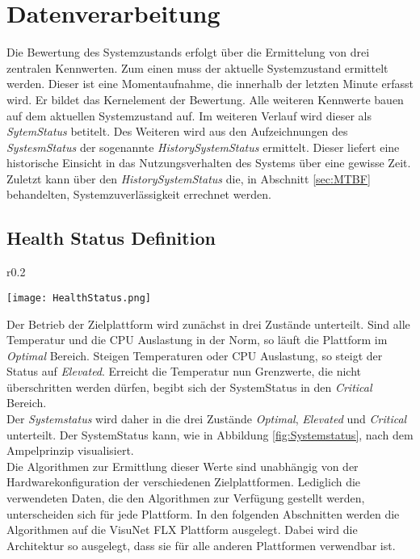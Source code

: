 \section{Datenverarbeitung}\label{sec:Datenverarbeitung}
Die Bewertung des Systemzustands erfolgt über die Ermittelung von drei zentralen Kennwerten. Zum einen muss der aktuelle Systemzustand ermittelt werden. Dieser ist eine Momentaufnahme, die innerhalb der letzten Minute erfasst wird. Er bildet das Kernelement der Bewertung. Alle weiteren Kennwerte bauen auf dem aktuellen Systemzustand auf. Im weiteren Verlauf wird dieser als \textit{SytemStatus} betitelt. Des Weiteren wird aus den Aufzeichnungen des \textit{SystesmStatus} der sogenannte \textit{HistorySystemStatus} ermittelt. Dieser liefert eine historische Einsicht in das Nutzungsverhalten des Systems über eine gewisse Zeit. Zuletzt kann über den \textit{HistorySystemStatus} die, in Abschnitt \ref{sec:MTBF} behandelten, Systemzuverlässigkeit errechnet werden.
\newpage
\subsection{Health Status Definition}
\begin{wrapfigure}{r}{0.2\textwidth}
    \vspace{-1.2cm}
    \begin{center}
      \texttt{[image: HealthStatus.png]}
    \end{center}
    \vspace{-0.5cm}
    \caption{}
    \label{fig:Systemstatus}
    \vspace{-0.5cm}
\end{wrapfigure}
Der Betrieb der Zielplattform wird zunächst in drei Zustände unterteilt. Sind alle Temperatur und die CPU Auslastung in der Norm, so läuft die Plattform im \textit{Optimal} Bereich. Steigen Temperaturen oder CPU Auslastung, so steigt der Status auf \textit{Elevated}. Erreicht die Temperatur nun Grenzwerte, die nicht überschritten werden dürfen, begibt sich der SystemStatus in den \textit{Critical} Bereich.\\
Der \textit{Systemstatus} wird daher in die drei Zustände \textit{Optimal}, \textit{Elevated} und \textit{Critical} unterteilt. Der SystemStatus kann, wie in  Abbildung \ref{fig:Systemstatus}, nach dem Ampelprinzip visualisiert.\\
Die Algorithmen zur Ermittlung dieser Werte sind unabhängig von der Hardwarekonfiguration der verschiedenen Zielplattformen. Lediglich die verwendeten Daten, die den Algorithmen zur Verfügung gestellt werden, unterscheiden sich für jede Plattform. In den folgenden Abschnitten werden die Algorithmen auf die VisuNet FLX Plattform ausgelegt. Dabei wird die Architektur so ausgelegt, dass sie für alle anderen Plattformen verwendbar ist.
  
